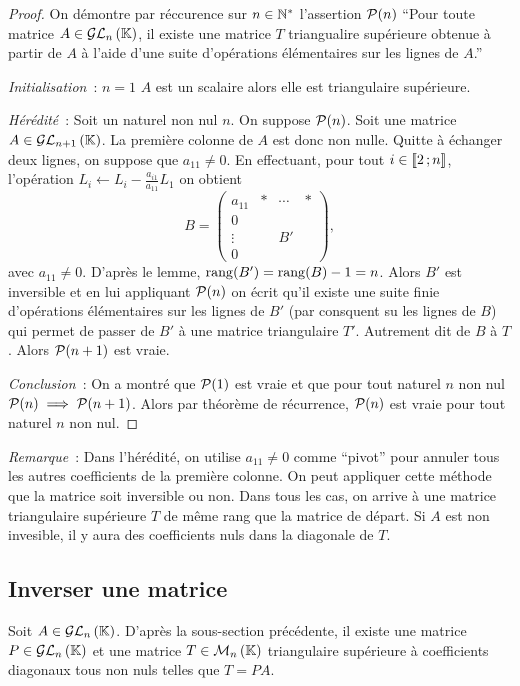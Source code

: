 \begin{proof}
  On démontre par réccurence sur \(n \in \N^*\) l'assertion \(\P(n)\) ``Pour
  toute matrice \(A \in \GLn{n}{\K}\), il existe une matrice \(T\) triangualire
  supérieure obtenue à partir de \(A\) à l'aide d'une suite d'opérations
  élémentaires sur les lignes de \(A\).''

  \emph{Initialisation}~: \(n = 1\) \(A\) est un scalaire alors elle est
  triangulaire supérieure.

  \emph{Hérédité}~: Soit un naturel non nul \(n\). On suppose \(\P(n)\). Soit
  une matrice \(A \in \GLn{n+1}{\K}\). La première colonne de \(A\) est donc non
  nulle. Quitte à échanger deux lignes, on suppose que \(a_{11}\neq 0\). En
  effectuant, pour tout \(i \in \intervalleentier{2}{n}\), l'opération \(L_i
  \leftarrow L_i -\frac{a_{i1}}{a_{11}}L_1\) on obtient
  \begin{equation}
    B = \begin{pmatrix}
      a_{11} & * & \cdots & * \\
      0 & & & \\
      \vdots & & B' & \\
    0 & & & \end{pmatrix},
  \end{equation}
  avec \(a_{11}\neq 0\). D'après le lemme, \(\rg(B')=\rg(B)-1 = n\). Alors
  \(B'\) est inversible et en lui appliquant \(\P(n)\) on écrit qu'il existe une
  suite finie d'opérations élémentaires sur les lignes de \(B'\) (par consquent
  su les lignes de \(B\)) qui permet de passer de \(B'\) à une matrice
  triangulaire \(T'\). Autrement dit de \(B\) à \(T\). Alors \(\P(n+1)\) est
  vraie.

  \emph{Conclusion}~: On a montré que \(\P(1)\) est vraie et que pour tout
  naturel \(n\) non nul \(\P(n) \implies \P(n+1)\). Alors par théorème de
  récurrence, \(\P(n)\) est vraie pour tout naturel \(n\) non nul.
\end{proof}

\emph{Remarque}~: Dans l'hérédité, on utilise \(a_{11}\neq 0\) comme ``pivot''
pour annuler tous les autres coefficients de la première colonne. On peut
appliquer cette méthode que la matrice soit inversible ou non. Dans tous les
cas, on arrive à  une matrice triangulaire supérieure \(T\) de même rang que la
matrice de départ. Si \(A\) est non invesible, il y aura des coefficients nuls
dans la diagonale de \(T\).

\subsection{Inverser une matrice}
Soit \(A \in \GLn{n}{\K}\). D'après la sous-section précédente, il existe une
matrice \(P \in \GLn{n}{\K}\) et une matrice \(T \in \Mn{n}{\K}\) triangulaire
supérieure à coefficients diagonaux tous non nuls telles que \(T = PA\).


